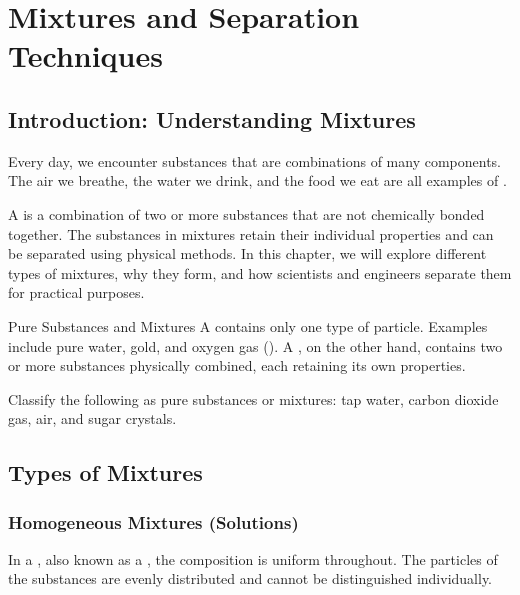 \chapter{Mixtures and Separation Techniques}

\section{Introduction: Understanding Mixtures}
Every day, we encounter substances that are combinations of many components. The air we breathe, the water we drink, and the food we eat are all examples of .

A  is a combination of two or more substances that are not chemically bonded together. The substances in mixtures retain their individual properties and can be separated using physical methods. In this chapter, we will explore different types of mixtures, why they form, and how scientists and engineers separate them for practical purposes.

\begin{keyconcept}{Pure Substances and Mixtures}
A  contains only one type of particle. Examples include pure water, gold, and oxygen gas (). A , on the other hand, contains two or more substances physically combined, each retaining its own properties.
\end{keyconcept}

\begin{marginfigure}
\centering
\caption{Illustration of particles in pure substances and mixtures.}
\label{fig:mixtures_pure}
\end{marginfigure}

\begin{stopandthink}
Classify the following as pure substances or mixtures: tap water, carbon dioxide gas, air, and sugar crystals.
\end{stopandthink}

\section{Types of Mixtures}

\subsection{Homogeneous Mixtures (Solutions)}
In a , also known as a , the composition is uniform throughout. The particles of the substances are evenly distributed and cannot be distinguished individually.

